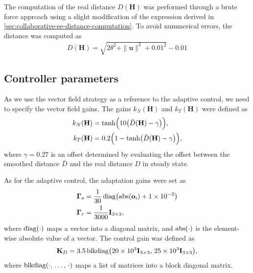 The computation of the real distance $D(\mathbf{H})$ was performed through a brute force approach using a slight modification of the expression derived in \cref{sec:collaborative-ee-distance-computation}. To avoid nummerical errors, the distance was computed as
\begin{align}
    D(\mathbf{H}) = \sqrt{2\theta^2 + \|\mathbf{u}\|^2 + 0.01^2} - 0.01
\end{align}

\subsection{Controller parameters}
As we use the vector field strategy as a reference to the adaptive control, we need to specify the vector field gains. The gains $k_N(\mathbf{H})$ and $k_T(\mathbf{H})$ were defined as
\begin{align}
    k_N(\mathbf{H}) &= \tanh\Bigl(10\bigl(\bar{D}(\mathbf{H})- \gamma\bigr)\Bigr),\\
    k_T(\mathbf{H}) &= 0.2\Bigl(1 - \tanh\bigl(\bar{D}(\mathbf{H}) - \gamma\bigr)\Bigr),
\end{align}
where $\gamma=0.27$ is an offset determined by evaluating the offset between the smoothed distance $\bar{D}$ and the real distance $D$ in steady state.

As for the adaptive control, the adaptation gains were set as
\begin{align}
    \boldsymbol{\Gamma}_o &= \frac{1}{30}\operatorname{diag}\bigl(\operatorname{abs}(\mathbf{o}_i) + \num{1E-2}\bigr)\\
    \boldsymbol{\Gamma}_r &= \frac{1}{3000}\mathbf{I}_{3\times3},
\end{align}
where $\operatorname{diag}(\cdot)$ maps a vector into a diagonal matrix, and $\operatorname{abs}(\cdot)$ is the element-wise absolute value of a vector. The control gain was defined as
\begin{align}
    \mathbf{K}_D = 3.5\operatorname{blkdiag}\bigl(\num{20E3}\mathbf{I}_{3\times3},\, \num{25E3}\mathbf{I}_{3\times3}\bigr),
\end{align}
where $\operatorname{blkdiag}(\cdot,\, \dots,\, \cdot)$ maps a list of matrices into a block diagonal matrix.
